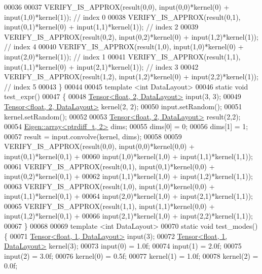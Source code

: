 \begin{DoxyCode}
00036 
00037   VERIFY\_IS\_APPROX(result(0,0), input(0,0)*kernel(0) + input(1,0)*kernel(1));  \textcolor{comment}{// index 0}
00038   VERIFY\_IS\_APPROX(result(0,1), input(0,1)*kernel(0) + input(1,1)*kernel(1));  \textcolor{comment}{// index 2}
00039   VERIFY\_IS\_APPROX(result(0,2), input(0,2)*kernel(0) + input(1,2)*kernel(1));  \textcolor{comment}{// index 4}
00040   VERIFY\_IS\_APPROX(result(1,0), input(1,0)*kernel(0) + input(2,0)*kernel(1));  \textcolor{comment}{// index 1}
00041   VERIFY\_IS\_APPROX(result(1,1), input(1,1)*kernel(0) + input(2,1)*kernel(1));  \textcolor{comment}{// index 3}
00042   VERIFY\_IS\_APPROX(result(1,2), input(1,2)*kernel(0) + input(2,2)*kernel(1));  \textcolor{comment}{// index 5}
00043 \}
00044 
00045 \textcolor{keyword}{template} <\textcolor{keywordtype}{int} DataLayout>
00046 \textcolor{keyword}{static} \textcolor{keywordtype}{void} test\_expr()
00047 \{
00048   \hyperlink{class_eigen_1_1_tensor}{Tensor<float, 2, DataLayout>} input(3, 3);
00049   \hyperlink{class_eigen_1_1_tensor}{Tensor<float, 2, DataLayout>} kernel(2, 2);
00050   input.setRandom();
00051   kernel.setRandom();
00052 
00053   \hyperlink{class_eigen_1_1_tensor}{Tensor<float, 2, DataLayout>} result(2,2);
00054   \hyperlink{class_eigen_1_1array}{Eigen::array<ptrdiff\_t, 2>} dims;
00055   dims[0] = 0;
00056   dims[1] = 1;
00057   result = input.convolve(kernel, dims);
00058 
00059   VERIFY\_IS\_APPROX(result(0,0), input(0,0)*kernel(0,0) + input(0,1)*kernel(0,1) +
00060                                 input(1,0)*kernel(1,0) + input(1,1)*kernel(1,1));
00061   VERIFY\_IS\_APPROX(result(0,1), input(0,1)*kernel(0,0) + input(0,2)*kernel(0,1) +
00062                                 input(1,1)*kernel(1,0) + input(1,2)*kernel(1,1));
00063   VERIFY\_IS\_APPROX(result(1,0), input(1,0)*kernel(0,0) + input(1,1)*kernel(0,1) +
00064                                 input(2,0)*kernel(1,0) + input(2,1)*kernel(1,1));
00065   VERIFY\_IS\_APPROX(result(1,1), input(1,1)*kernel(0,0) + input(1,2)*kernel(0,1) +
00066                                 input(2,1)*kernel(1,0) + input(2,2)*kernel(1,1));
00067 \}
00068 
00069 \textcolor{keyword}{template} <\textcolor{keywordtype}{int} DataLayout>
00070 \textcolor{keyword}{static} \textcolor{keywordtype}{void} test\_modes() \{
00071   \hyperlink{class_eigen_1_1_tensor}{Tensor<float, 1, DataLayout>} input(3);
00072   \hyperlink{class_eigen_1_1_tensor}{Tensor<float, 1, DataLayout>} kernel(3);
00073   input(0) = 1.0f;
00074   input(1) = 2.0f;
00075   input(2) = 3.0f;
00076   kernel(0) = 0.5f;
00077   kernel(1) = 1.0f;
00078   kernel(2) = 0.0f;

\end{DoxyCode}
